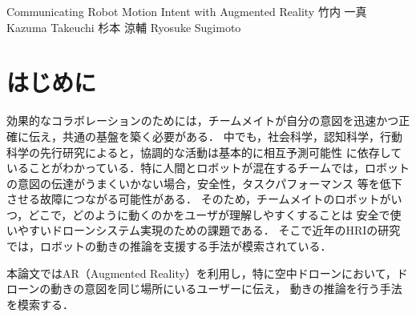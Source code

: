 \documentclass[a4paper,10pt,twocolumn,uplatex]{jsarticle}
\date{16}
\begin{document}
{Communicating Robot Motion Intent with Augmented Reality}
{竹内 一真}
{Kazuma Takeuchi}
{杉本 涼輔}
{Ryosuke Sugimoto}




\section{はじめに}
効果的なコラボレーションのためには，チームメイトが自分の意図を迅速かつ正確に伝え，共通の基盤を築く必要がある．
中でも，社会科学，認知科学，行動科学の先行研究によると，協調的な活動は基本的に相互予測可能性
に依存していることがわかっている．特に人間とロボットが混在するチームでは，ロボットの意図の伝達がうまくいかない場合，安全性，タスクパフォーマンス
等を低下させる故障につながる可能性がある．
そのため，チームメイトのロボットがいつ，どこで，どのように動くのかをユーザが理解しやすくすることは
安全で使いやすいドローンシステム実現のための課題である．
そこで近年のHRIの研究では，ロボットの動きの推論を支援する手法が模索されている．

本論文\cite{main}ではAR（Augmented Reality）を利用し，特に空中ドローンにおいて，ドローンの動きの意図を同じ場所にいるユーザーに伝え，
動きの推論を行う手法を模索する．
\end{document}
